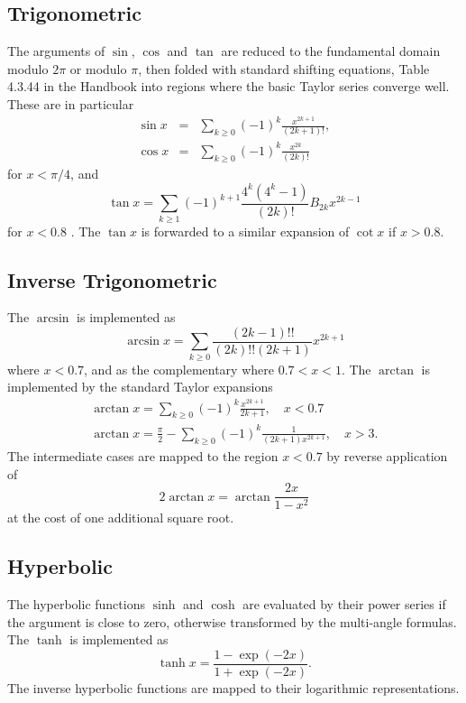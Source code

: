\documentclass[showpacs,showkeys,amssymb,aps,twocolumn]{revtex4-1}
\begin{document}
\subsection{Trigonometric}
The arguments of $\sin$, $\cos$ and $\tan$ are reduced to the fundamental
domain modulo $2\pi$ or modulo $\pi$, then folded with standard shifting
equations, Table 4.3.44 in the Handbook \cite{AS} into regions where
the basic Taylor series converge well. These are in particular
\begin{eqnarray}
\sin x &=& \sum_{k\ge 0} (-1)^k\frac{x^{2k+1}}{(2k+1)!}, \\
\cos x &=& \sum_{k\ge 0} (-1)^k\frac{x^{2k}}{(2k)!}
\end{eqnarray}
for $x< \pi/4$, and
\begin{equation}
\tan x = \sum_{k\ge 1} (-1)^{k+1}\frac{4^k(4^k-1)}{(2k)!}B_{2k} x^{2k-1}
\label{eq.tanT}
\end{equation}
for $x<0.8$ \cite[(4.3.67)]{AS}. The $\tan x$ is forwarded to a similar
expansion of $\cot x$ \cite[(4.3.70)]{AS} if $x>0.8$.


\subsection{Inverse Trigonometric}
The $\arcsin$ is implemented as \cite[(4.4.40)]{AS}
\begin{equation}
\arcsin x = \sum_{k\ge 0} \frac{(2k-1)!!}{(2k)!! (2k+1)}x^{2k+1}
\end{equation}
where $x<0.7$, and as the complementary \cite[(4.4.41)]{AS}
where $0.7<x<1$. The $\arctan$ is implemented by the
standard Taylor expansions
\begin{eqnarray}
\arctan x = \sum_{k \ge 0} (-1)^k \frac{x^{2k+1}}{2k+1},\quad x<0.7\\
\arctan x = \frac{\pi}{2}-\sum_{k \ge 0} (-1)^k \frac{1}{(2k+1)x^{2k+1}},\quad x>3.
\end{eqnarray}
The intermediate cases are mapped to the region $x<0.7$ by reverse application
of \cite[(4.4.34)]{AS}
\begin{equation}
2\arctan x = \arctan\frac{2x}{1-x^2}
\end{equation}
at the cost of one additional square root.

\subsection{Hyperbolic}

The hyperbolic functions $\sinh$ and $\cosh$ are evaluated by
their power series \cite[(4.5.62),(4.5.63)]{AS} if the argument is
close to zero, otherwise transformed by the multi-angle formulas. The
$\tanh$ is implemented as
\begin{equation}
\tanh x = \frac{1-\exp(-2x)}{1+\exp(-2x)}.
\end{equation}
The inverse hyperbolic functions are mapped to their logarithmic representations.
\end{document}
